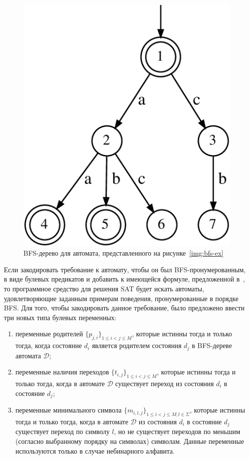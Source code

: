 \begin{figure}[ht]
  \centering
  \includegraphics[scale=0.15]{img/datamod/BFS-tree.eps}
  \caption{BFS-дерево для автомата, представленного на рисунке~\ref{img:bfs-ex}}
  \label{img:bfs-tree-ex}
\end{figure}

Если закодировать требование к автомату, чтобы он был BFS-пронумерованным, в виде булевых предикатов и добавить к имеющейся формуле, предложенной в~\cite{heule-icgi10}, то программное средство для решения SAT будет искать автоматы, удовлетворяющие заданным примерам поведения, пронумерованные в порядке BFS.
Для того, чтобы закодировать данное требование, было предложено ввести три новых типа булевых переменных:

\begin{enumerate}
  \item переменные родителей $\{p_{j,i}\}_{1 \leq i < j \leq M}$, которые истинны тогда и только тогда, когда состояние $d_i$ является родителем состояния $d_j$ в BFS-дереве автомата $\mathcal{D}$;
  \item переменные наличия переходов $\{t_{i,j}\}_{1 \leq i < j \leq M}$, которые истинны тогда и только тогда, когда в автомате $\mathcal{D}$ существует переход из состояния $d_{i}$ в состояние $d_{j}$;
  \item переменные минимального символа $\{m_{i,l,j}\}_{1 \leq i < j \leq M;l \in \Sigma}$, которые истинны тогда и только тогда, когда в автомате $\mathcal{D}$ из состояния $d_{i}$ в состояние $d_{j}$ существует переход по символу $l$, но не существует переходов по меньшим (согласно выбранному порядку на символах) символам.
  Данные переменные используются только в случае небинарного алфавита.
\end{enumerate}

